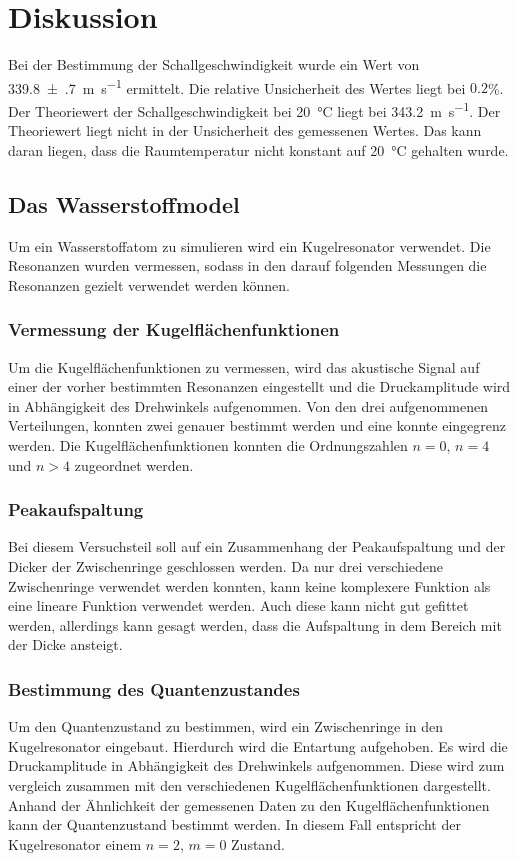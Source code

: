 \section{Diskussion}
\label{sec:Diskussion}
Bei der Bestimmung der Schallgeschwindigkeit wurde ein Wert von \SI{339.8(7)}{\meter\per\second} ermittelt. 
Die relative Unsicherheit des Wertes liegt bei $\num{0.2}$\%. Der Theoriewert der Schallgeschwindigkeit bei 
\SI{20}{\celsius} liegt bei \SI{343.2}{\meter\per\second}. Der Theoriewert liegt nicht in der Unsicherheit des 
gemessenen Wertes. Das kann daran liegen, dass die Raumtemperatur nicht konstant auf \SI{20}{\celsius} gehalten wurde.

\subsection{Das Wasserstoffmodel}
Um ein Wasserstoffatom zu simulieren wird ein Kugelresonator verwendet. Die Resonanzen wurden vermessen, sodass in den darauf 
folgenden Messungen die Resonanzen gezielt verwendet werden können.
\subsubsection{Vermessung der Kugelflächenfunktionen}
Um die Kugelflächenfunktionen zu vermessen, wird das akustische Signal auf einer der vorher bestimmten Resonanzen eingestellt 
und die Druckamplitude wird in Abhängigkeit des Drehwinkels aufgenommen.
Von den drei aufgenommenen Verteilungen, konnten zwei genauer bestimmt werden und eine konnte eingegrenz werden.
Die Kugelflächenfunktionen konnten die Ordnungszahlen $n=0$, $n=4$ und $n>4$ zugeordnet werden.
\subsubsection{Peakaufspaltung}
Bei diesem Versuchsteil soll auf ein Zusammenhang der Peakaufspaltung und der Dicker der Zwischenringe geschlossen werden.
Da nur drei verschiedene Zwischenringe verwendet werden konnten, kann keine komplexere Funktion als eine lineare Funktion 
verwendet werden. Auch diese kann nicht gut gefittet werden, allerdings kann gesagt werden, dass die Aufspaltung in dem Bereich
mit der Dicke ansteigt. 
\subsubsection{Bestimmung des Quantenzustandes}
Um den Quantenzustand zu bestimmen, wird ein Zwischenringe in den Kugelresonator eingebaut. Hierdurch wird die 
Entartung aufgehoben. 
Es wird die Druckamplitude in Abhängigkeit des Drehwinkels aufgenommen. Diese wird zum vergleich zusammen mit den verschiedenen
Kugelflächenfunktionen dargestellt.
Anhand der Ähnlichkeit der gemessenen Daten zu den Kugelflächenfunktionen kann der Quantenzustand bestimmt werden.
In diesem Fall entspricht der Kugelresonator einem $n=2$, $m=0$ Zustand.
